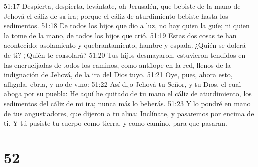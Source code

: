 51:17 Despierta, despierta, levántate, oh Jerusalén, que bebiste de la mano de Jehová el cáliz de su ira; porque el cáliz de aturdimiento bebiste hasta los sedimentos.  
51:18 De todos los hijos que dio a luz, no hay quien la guíe; ni quien la tome de la mano, de todos los hijos que crió.  
51:19 Estas dos cosas te han acontecido: asolamiento y quebrantamiento, hambre y espada. ¿Quién se dolerá de ti? ¿Quién te consolará?  
51:20 Tus hijos desmayaron, estuvieron tendidos en las encrucijadas de todos los caminos, como antílope en la red, llenos de la indignación de Jehová, de la ira del Dios tuyo.  
51:21 Oye, pues, ahora esto, afligida, ebria, y no de vino:  
51:22 Así dijo Jehová tu Señor, y tu Dios, el cual aboga por su pueblo: He aquí he quitado de tu mano el cáliz de aturdimiento, los sedimentos del cáliz de mi ira; nunca más lo beberás.  
51:23 Y lo pondré en mano de tus angustiadores, que dijeron a tu alma: Inclínate, y pasaremos por encima de ti. Y tú pusiste tu cuerpo como tierra, y como camino, para que pasaran.  

\chapter{52}

